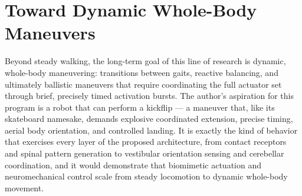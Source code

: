 \section{Toward Dynamic Whole-Body Maneuvers}\label{sec:fw_kickflip}

Beyond steady walking, the long-term goal of this line of research is dynamic, whole-body maneuvering: transitions between gaits, reactive balancing, and ultimately ballistic maneuvers that require coordinating the full actuator set through brief, precisely timed activation bursts. The author's aspiration for this program is a robot that can perform a kickflip --- a maneuver that, like its skateboard namesake, demands explosive coordinated extension, precise timing, aerial body orientation, and controlled landing. It is exactly the kind of behavior that exercises every layer of the proposed architecture, from contact receptors and spinal pattern generation to vestibular orientation sensing and cerebellar coordination, and it would demonstrate that biomimetic actuation and neuromechanical control scale from steady locomotion to dynamic whole-body movement.

